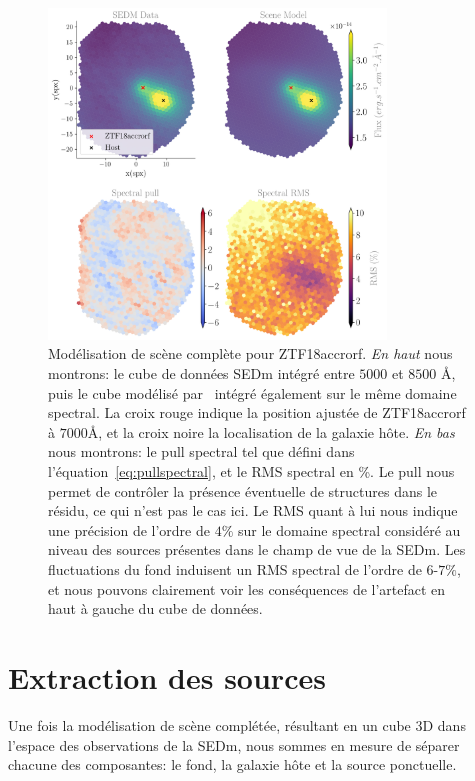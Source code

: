\documentclass[../main/main.tex]{subfiles}
\begin{document}
\begin{figure}
  \centering
  \includegraphics[width=0.8\textwidth]{../figures/07_scene/scene_rmspull_ZTF18accrorf.png}
  \caption[Modélisation de scène complète pour
  ZTF18accrorf.]{Modélisation de scène complète pour
    ZTF18accrorf. \emph{En haut} nous montrons:
  le cube de données SEDm intégré entre $5000$ et $8500$ \AA, puis le cube
  modélisé par \hypergal\ intégré également sur le même domaine
  spectral. La croix rouge indique la position ajustée de ZTF18accrorf à
$7000$\AA, et la croix noire la localisation de la galaxie hôte. \emph{En
  bas} nous montrons: le pull spectral tel que
défini dans l'équation~\ref{eq:pullspectral}, et le RMS spectral en
\%. Le pull nous permet de contrôler la présence éventuelle de structures dans le
résidu, ce qui n'est pas le cas ici. Le RMS quant à lui nous indique une
précision de l'ordre de $4\%$ sur le domaine spectral considéré au
niveau des sources présentes dans le champ de vue de la SEDm. Les
fluctuations du fond induisent un RMS spectral de l'ordre de $6$-$7\%$,
et nous pouvons clairement voir les conséquences de l'artefact en haut à
gauche du cube de données.}
  \label{fig:fullsceneZTF18accrorf}
\end{figure}

\section{Extraction des sources}

Une fois la modélisation de scène complétée, résultant en
un cube 3D dans l'espace des observations de la SEDm, nous sommes en mesure
de séparer chacune des composantes: le fond, la galaxie hôte et la source
ponctuelle. 
\end{document}
